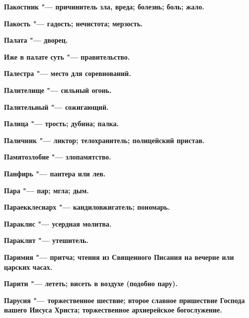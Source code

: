 \begin{multicols}{2}
\bfseries Пакостник\normalfont{} "--- причинитель зла, вреда; болезнь; боль; жало. 




\bfseries Пакость\normalfont{} "--- гадость; нечистота; мерзость. 




\bfseries Палата\normalfont{} "--- дворец. 




\bfseries Иже в палате суть\normalfont{} "--- правительство. 




\bfseries Палестра\normalfont{} "--- место для соревнований. 




\bfseries Палителище\normalfont{} "--- сильный огонь. 




\bfseries Палительный\normalfont{} "--- сожигающий. 




\bfseries Палица\normalfont{} "--- трость; дубина; палка. 




\bfseries Паличник\normalfont{} "--- ликтор; телохранитель; полицейский пристав. 




\bfseries Памятозлобие\normalfont{} "--- злопамятство. 




\bfseries Панфирь\normalfont{} "--- пантера или лев. 




\bfseries Пара\normalfont{} "--- пар; мгла; дым. 




\bfseries Параекклесиарх\normalfont{} "--- кандиловжигатель; пономарь. 




\bfseries Параклис\normalfont{} "--- усердная молитва. 




\bfseries Параклит\normalfont{} "--- утешитель. 




\bfseries Паримия\normalfont{} "--- притча; чтения из Священного Писания на вечерне или царских часах. 




\bfseries Парити\normalfont{} "--- лететь; висеть в воздухе (подобно пару). 




\bfseries Парусия\normalfont{} "--- торжественное шествие; второе славное пришествие Господа нашего Иисуса Христа; торжественное архиерейское богослужение. 





\end{multicols}
